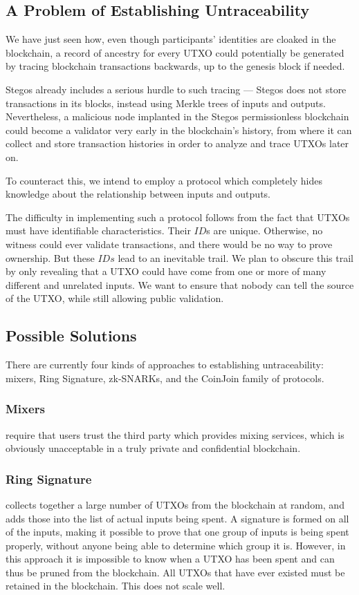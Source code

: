 \documentclass[a4paper, 10pt, conference]{ieeeconf}
\begin{document}
\subsection{A Problem of Establishing Untraceability}
We have just seen how, even though participants' identities are cloaked in the blockchain, a record of ancestry for every UTXO could potentially be generated by tracing blockchain transactions backwards, up to the genesis block if needed.

Stegos already includes a serious hurdle to such tracing --- Stegos does not store transactions in its blocks, instead using Merkle trees of inputs and outputs. Nevertheless, a malicious node implanted in the Stegos permissionless blockchain could become a validator very early in the blockchain's history, from where it can collect and store transaction histories in order to analyze and trace UTXOs later on.

To counteract this, we intend to employ a protocol which completely hides knowledge about the relationship between inputs and outputs.

The difficulty in implementing such a protocol follows from the fact that UTXOs must have identifiable characteristics. Their $ID$s are unique. Otherwise, no witness could ever validate transactions, and there would be no way to prove ownership. But these $IDs$ lead to an inevitable trail. We plan to obscure this trail by only revealing that a UTXO could have come from one or more of many different and unrelated inputs. We want to ensure that nobody can tell the source of the UTXO, while still allowing public validation.

\subsection{Possible Solutions}
There are currently four kinds of approaches to establishing untraceability: mixers, Ring Signature, zk-SNARKs, and the CoinJoin family of protocols.

\subsubsection{Mixers} require that users trust the third party which provides mixing services, which is obviously unacceptable in a truly private and confidential blockchain.

\subsubsection{Ring Signature} collects together a large number of UTXOs from the blockchain at random, and adds those into the list of actual inputs being spent. A signature is formed on all of the inputs, making it possible to prove that one group of inputs is being spent properly, without anyone being able to determine which group it is. However, in this approach it is impossible to know when a UTXO has been spent and can thus be pruned from the blockchain. All UTXOs that have ever existed must be retained in the blockchain. This does not scale well.
\end{document}
